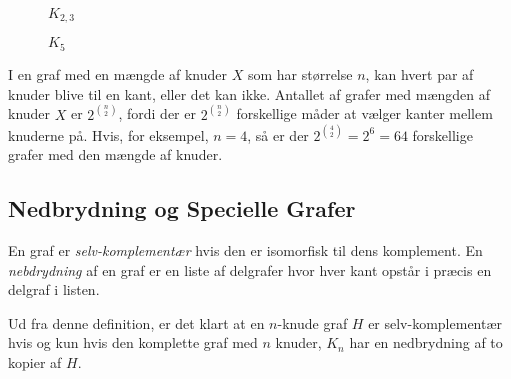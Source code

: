 \begin{figure}[H]
	\centering
	\caption{\label{fig:k23pp9} $K_{2,3}$}
\end{figure}

\begin{figure}[H]
	\centering
	\caption{\label{fig:k5pp9} $K_{5}$}
\end{figure}

I en graf med en mængde af knuder $X$ som har størrelse $n$, kan hvert par af knuder blive til en kant, eller det kan ikke. Antallet af grafer med mængden af knuder $X$ er $2^{\binom{n}{2}}$, fordi der er $2^{\binom{n}{2}}$ forskellige måder at vælger kanter mellem knuderne på. Hvis, for eksempel, $n = 4$, så er der $2^{\binom{4}{2}} = 2^{6} = 64$ forskellige grafer med den mængde af knuder.

\subsection{Nedbrydning og Specielle Grafer}%
\label{subsec:label}

\begin{definition}
	En graf er \textit{selv-komplementær} hvis den er isomorfisk til dens komplement. En \textit{nebdrydning} af en graf er en liste af delgrafer hvor hver kant opstår i præcis en delgraf i listen.
\end{definition}

Ud fra denne definition, er det klart at en $n$-knude graf $H$ er selv-komplementær hvis og kun hvis den komplette graf med $n$ knuder, $K_{n}$ har en nedbrydning af to kopier af $H$.




